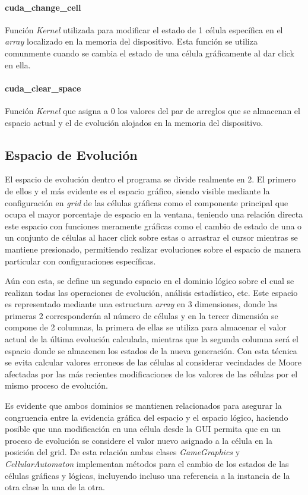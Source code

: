 \documentclass[]{article}
\begin{document}
			\paragraph{cuda\_change\_cell}
				Función \textit{Kernel} utilizada para modificar el estado de 1 célula específica en el \textit{array} localizado en la memoria del dispositivo. Esta función se utiliza comunmente cuando se cambia el estado de una célula gráficamente al dar click en ella.
				
			\paragraph{cuda\_clear\_space}
				Función \textit{Kernel} que asigna a 0 los valores del par de arreglos que se almacenan el espacio actual y el de evolución alojados en la memoria del dispositivo.
	
	\subsection{Espacio de Evolución}
		El espacio de evolución dentro el programa se divide realmente en 2. El primero de ellos y el más evidente es el espacio gráfico, siendo visible mediante la configuración en \textit{grid} de las células gráficas como el componente principal que ocupa el mayor porcentaje de espacio en la ventana, teniendo una relación directa este espacio con funciones meramente gráficas como el cambio de estado de una o un conjunto de células al hacer click sobre estas o arrastrar el cursor mientras se mantiene presionado, permitiendo realizar evoluciones sobre el espacio de manera particular con configuraciones específicas.
		
		Aún con esta, se define un segundo espacio en el dominio lógico sobre el cual se realizan todas las operaciones de evolución, análisis estadístico, etc. Este espacio es representado mediante una estructura \textit{array} en 3 dimensiones, donde las primeras 2 corresponderán al número de células y en la tercer dimensión se compone de 2 columnas, la primera de ellas se utiliza para almacenar el valor actual de la última evolución calculada, mientras que la segunda columna será el espacio donde se almacenen los estados de la nueva generación. Con esta técnica se evita calcular valores erroneos de las células al considerar vecindades de Moore afectadas por las más recientes modificaciones de los valores de las células por el mismo proceso de evolución.
		
		Es evidente que ambos dominios se mantienen relacionados para asegurar la congruencia entre la evidencia gráfica del espacio y el espacio lógico, haciendo posible que una modificación en una célula desde la GUI permita que en un proceso de evolución se considere el valor nuevo asignado a la célula en la posición del grid. De esta relación ambas clases \textit{GameGraphics} y \textit{CellularAutomaton} implementan métodos para el cambio de los estados de las células gráficas y lógicas, incluyendo incluso una referencia a la instancia de la otra clase la una de la otra.
		
\end{document}
